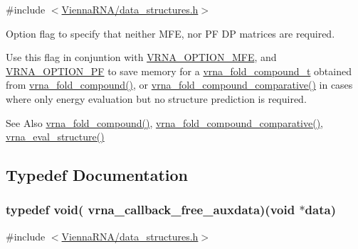 {\ttfamily \#include $<$\hyperlink{data__structures_8h}{Vienna\-R\-N\-A/data\-\_\-structures.\-h}$>$}



Option flag to specify that neither M\-F\-E, nor P\-F D\-P matrices are required. 

Use this flag in conjuntion with \hyperlink{group__fold__compound_gae63be9127fe7dcc1f9bb14f5bb1064ee}{V\-R\-N\-A\-\_\-\-O\-P\-T\-I\-O\-N\-\_\-\-M\-F\-E}, and \hyperlink{group__fold__compound_gabfbadcddda3e74ce7f49035ef8f058f7}{V\-R\-N\-A\-\_\-\-O\-P\-T\-I\-O\-N\-\_\-\-P\-F} to save memory for a \hyperlink{group__fold__compound_ga1b0cef17fd40466cef5968eaeeff6166}{vrna\-\_\-fold\-\_\-compound\-\_\-t} obtained from \hyperlink{group__fold__compound_ga6601d994ba32b11511b36f68b08403be}{vrna\-\_\-fold\-\_\-compound()}, or \hyperlink{group__fold__compound_gad6bacc816af274922b13d947f708aa0c}{vrna\-\_\-fold\-\_\-compound\-\_\-comparative()} in cases where only energy evaluation but no structure prediction is required.

\begin{DoxySeeAlso}{See Also}
\hyperlink{group__fold__compound_ga6601d994ba32b11511b36f68b08403be}{vrna\-\_\-fold\-\_\-compound()}, \hyperlink{group__fold__compound_gad6bacc816af274922b13d947f708aa0c}{vrna\-\_\-fold\-\_\-compound\-\_\-comparative()}, \hyperlink{group__eval_ga58f199f1438d794a265f3b27fc8ea631}{vrna\-\_\-eval\-\_\-structure()} 
\end{DoxySeeAlso}


\subsection{Typedef Documentation}
\hypertarget{group__fold__compound_ga75aaf7b809290de808e545877a9e20f7}{
\subsubsection[{vrna\-\_\-callback\-\_\-free\-\_\-auxdata}]{\setlength{\rightskip}{0pt plus 5cm}typedef void( vrna\-\_\-callback\-\_\-free\-\_\-auxdata)(void $\ast$data)}}\label{group__fold__compound_ga75aaf7b809290de808e545877a9e20f7}


{\ttfamily \#include $<$\hyperlink{data__structures_8h}{Vienna\-R\-N\-A/data\-\_\-structures.\-h}$>$}



